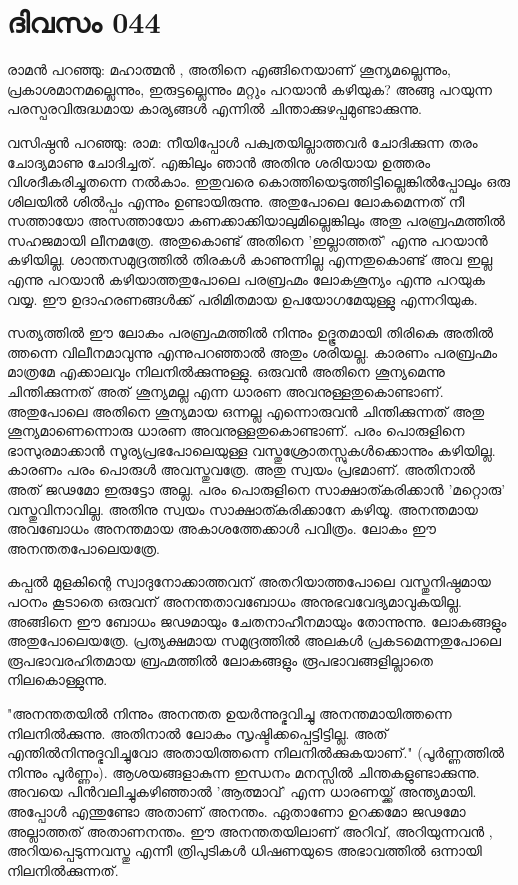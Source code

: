  
\section{ദിവസം 044}


രാമന്‍ പറഞ്ഞു: മഹാത്മന്‍ , അതിനെ എങ്ങിനെയാണ്‌ ശൂന്യമല്ലെന്നും, പ്രകാശമാനമല്ലെന്നും, ഇരുട്ടല്ലെന്നും മറ്റും പറയാന്‍ കഴിയുക? അങ്ങു പറയുന്ന പരസ്പരവിരുദ്ധമായ കാര്യങ്ങള്‍ എന്നില്‍ ചിന്താക്കുഴപ്പമുണ്ടാക്കുന്നു.

വസിഷ്ഠന്‍ പറഞ്ഞു: രാമ: നീയിപ്പോള്‍ പക്വതയില്ലാത്തവര്‍ ചോദിക്കുന്ന തരം ചോദ്യമാണു ചോദിച്ചത്‌. എങ്കിലും ഞാന്‍ അതിനു ശരിയായ ഉത്തരം വിശദീകരിച്ചുതന്നെ നല്‍കാം. ഇതുവരെ കൊത്തിയെടുത്തിട്ടില്ലെങ്കില്‍പ്പോലും ഒരു ശിലയില്‍ ശില്‍പ്പം എന്നും ഉണ്ടായിരുന്നു. അതുപോലെ ലോകമെന്നത്‌ നീ സത്തായോ അസത്തായോ കണക്കാക്കിയാലുമില്ലെങ്കിലും അതു പരബ്രഹ്മത്തില്‍ സഹജമായി ലീനമത്രേ. അതുകൊണ്ട്‌ അതിനെ 'ഇല്ലാത്തത്‌' എന്നു പറയാന്‍ കഴിയില്ല. ശാന്തസമുദ്രത്തില്‍ തിരകള്‍ കാണുന്നില്ല എന്നതുകൊണ്ട്‌ അവ ഇല്ല എന്നു പറയാന്‍ കഴിയാത്തതുപോലെ പരബ്രഹ്മം ലോകശൂന്യം എന്നു പറയുക വയ്യ. ഈ ഉദാഹരണങ്ങള്‍ക്ക്‌ പരിമിതമായ ഉപയോഗമേയുള്ളു എന്നറിയുക. 

സത്യത്തില്‍ ഈ ലോകം പരബ്രഹ്മത്തില്‍ നിന്നും ഉദ്ഭൂതമായി തിരികെ അതില്‍ ത്തന്നെ വിലീനമാവുന്നു എന്നുപറഞ്ഞാല്‍ അതും ശരിയല്ല. കാരണം പരബ്രഹ്മം മാത്രമേ എക്കാലവും നിലനില്‍ക്കുന്നുള്ളു. ഒരുവന്‍ അതിനെ ശൂന്യമെന്നു ചിന്തിക്കുന്നത്‌ അത്‌ ശൂന്യമല്ല എന്ന ധാരണ അവനുള്ളതുകൊണ്ടാണ്‌. അതുപോലെ അതിനെ ശൂന്യമായ ഒന്നല്ല എന്നൊരുവന്‍ ചിന്തിക്കുന്നത്‌ അതു ശൂന്യമാണെന്നൊരു ധാരണ അവനുള്ളതുകൊണ്ടാണ്‌. പരം പൊരുളിനെ ഭാസുരമാക്കാന്‍ സൂര്യപ്രഭപോലെയുള്ള വസ്തുശ്രോതസ്സുകള്‍ക്കൊന്നും കഴിയില്ല. കാരണം പരം പൊരുള്‍ അവസ്തുവത്രേ. അതു സ്വയം പ്രഭമാണ്‌. അതിനാല്‍ അത്‌ ജഢമോ ഇരുട്ടോ അല്ല. പരം പൊരുളിനെ സാക്ഷാത്കരിക്കാന്‍ 'മറ്റൊരു' വസ്തുവിനാവില്ല. അതിനു സ്വയം സാക്ഷാത്കരിക്കാനേ കഴിയൂ. അനന്തമായ അവബോധം അനന്തമായ അകാശത്തേക്കാള്‍ പവിത്രം. ലോകം ഈ അനന്തതപോലെയത്രേ. 

കപ്പല്‍ മുളകിന്റെ സ്വാദുനോക്കാത്തവന്‌ അതറിയാത്തപോലെ വസ്തുനിഷ്ഠമായ പഠനം കൂടാതെ ഒരുവന്‌ അനന്തതാവബോധം അനുഭവവേദ്യമാവുകയില്ല. അങ്ങിനെ ഈ ബോധം ജഢമായും ചേതനാഹീനമായും തോന്നുന്നു. ലോകങ്ങളും അതുപോലെയത്രേ. പ്രത്യക്ഷമായ സമുദ്രത്തില്‍ അലകള്‍ പ്രകടമെന്നതുപോലെ രൂപഭാവരഹിതമായ ബ്രഹ്മത്തില്‍ ലോകങ്ങളും രൂപഭാവങ്ങളില്ലാതെ നിലകൊള്ളുന്നു.

"അനന്തതയില്‍ നിന്നും അനന്തത ഉയര്‍ന്നുദ്ഭവിച്ചു അനന്തമായിത്തന്നെ നിലനില്‍ക്കുന്നു. അതിനാല്‍ ലോകം സൃഷ്ടിക്കപ്പെട്ടിട്ടില്ല. അത്‌ എന്തില്‍നിന്നുദ്ഭവിച്ചുവോ അതായിത്തന്നെ നിലനില്‍ക്കുകയാണ്‌." (പൂര്‍ണ്ണത്തില്‍ നിന്നും പൂര്‍ണ്ണം). ആശയങ്ങളാകുന്ന ഇന്ധനം മനസ്സില്‍ ചിന്തകളുണ്ടാക്കുന്നു. അവയെ പിന്‍വലിച്ചുകഴിഞ്ഞാല്‍ 'ആത്മാവ്‌' എന്ന ധാരണയ്ക്ക്‌ അന്ത്യമായി. അപ്പോള്‍ എന്തുണ്ടോ അതാണ്‌ അനന്തം. ഏതാണോ ഉറക്കമോ ജഢമോ അല്ലാത്തത്‌ അതാണനന്തം. ഈ അനന്തതയിലാണ്‌ അറിവ്‌, അറിയുന്നവന്‍ , അറിയപ്പെടുന്നവസ്തു എന്നീ ത്രിപുടികള്‍ ധിഷണയുടെ അഭാവത്തില്‍ ഒന്നായി നിലനില്‍ക്കുന്നത്‌.

